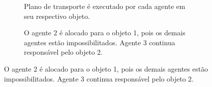 \begin{figure}[htpb]
  \vspace{0.3cm}
  \begin{subfigure}[t]{0.45\textwidth}
    \centering
    \caption{Plano de transporte é executado por cada agente em seu respectivo objeto.}
  \end{subfigure}
  \hspace{0.2cm}
  \begin{subfigure}[t]{0.45\textwidth}
    \centering
    \caption{O agente 2 é alocado para o objeto 1, pois os demais agentes estão impossibilitados. Agente 3 continua responsável pelo objeto 2.}
  \end{subfigure}


\end{figure}
